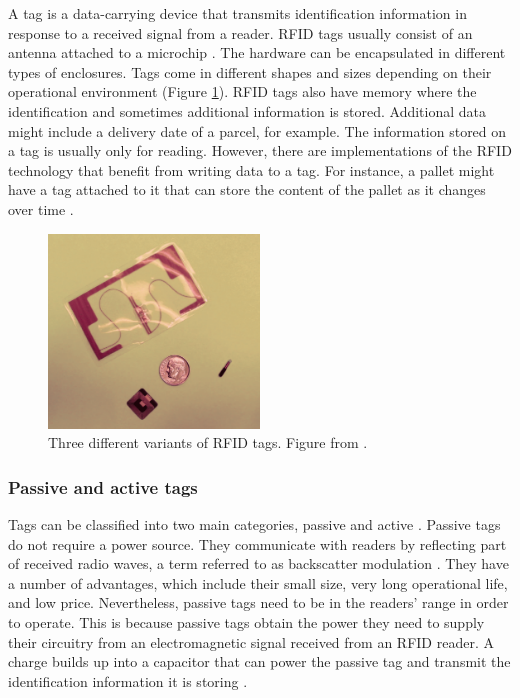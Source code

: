 A tag is a data-carrying device that transmits identification information in response to a received signal from a reader. RFID tags usually consist of an antenna attached to a microchip \cite[p. 2]{Want2006}. The hardware can be encapsulated in different types of enclosures. Tags come in different shapes and sizes depending on their operational environment (Figure \ref{fig:rfidtags}). RFID tags also have memory where the identification and sometimes additional information is stored. Additional data might include a delivery date of a parcel, for example. The information stored on a tag is usually only for reading. However, there are implementations of the RFID technology that benefit from writing data to a tag. For instance, a pallet might have a tag attached to it that can store the content of the pallet as it changes over time \cite[p. 8]{Hunt2007}.

\begin{figure}
	\begin{center}
		\includegraphics[width=0.5\textwidth]{figures/rfidtags}
		\caption{Three different variants of RFID tags. Figure from \cite{Want2006}.}
		\label{fig:rfidtags}
	\end{center}
\end{figure}

\subsubsection{Passive and active tags}

Tags can be classified into two main categories, passive and active . Passive tags do not require a power source. They communicate with readers by reflecting part of received radio waves, a term referred to as backscatter modulation \cite{Bolic2010}. They have a number of advantages, which include their small size, very long operational life, and low price. Nevertheless, passive tags need to be in the readers' range in order to operate. This is because passive tags obtain the power they need to supply their circuitry from an electromagnetic signal received from an RFID reader. A charge builds up into a capacitor that can power the passive tag and transmit the identification information it is storing \cite{Weinstein2005}.

